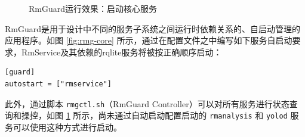 \begin{figure}[htbp]
    \hfill
    \vspace{1em}
    \hfill
	\caption{RmGuard运行效果：启动核心服务}
	\label{fig:rmg-service}
\end{figure}

RmGuard是用于设计中不同的服务子系统之间运行时依赖关系的、自启动管理的应用程序。如图 \ref{fig:rmg-core} 所示，通过在配置文件之中编写如下服务自启动要求，RmService及其依赖的rqlite服务将被按正确顺序启动：

\begin{verbatim}
[guard]
autostart = ["rmservice"]
\end{verbatim}

此外，通过脚本 \verb|rmgctl.sh|（RmGuard Controller）可以对所有服务进行状态查询和操控，如图 \ref{fig:rmg-service} 所示，尚未通过自动启动配置启动的 \verb|rmanalysis| 和 \verb|yolod| 服务可以使用这种方式进行启动。

